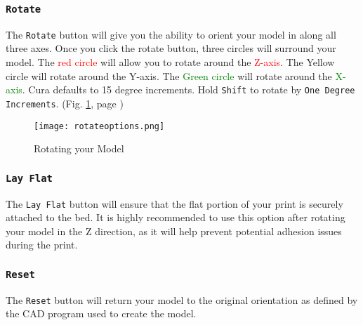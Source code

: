 \subsubsection{\texttt{Rotate}}
The \texttt{Rotate} button will give you the ability to orient your model in along all three axes. Once you click the rotate button, three circles will surround your model. The \textcolor{red}{red circle} will allow you to rotate around the \textcolor{red}{Z-axis}. The \textcolor{yellow1}{Yellow circle} will rotate around the \textcolor{yellow1}{Y-axis}. The \textcolor{green}{Green circle} will rotate around the \textcolor{green}{X-axis}. Cura defaults to 15 degree increments. Hold \texttt{Shift} to rotate by \texttt{One Degree Increments}. (Fig. \ref{fig:Rotating your Model}, page \pageref{fig:Rotating your Model})

\begin{figure}[H]
\centering
\texttt{[image: rotateoptions.png]}
\caption{Rotating your Model}
\label{fig:Rotating your Model}
\end{figure}

\subsubsection{\texttt{Lay Flat}}
The \texttt{Lay Flat} button will ensure that the flat portion of your print is securely attached to the bed. It is highly recommended to use this option after rotating your model in the Z direction, as it will help prevent potential adhesion issues during the print.

\subsubsection{\texttt{Reset}}
The \texttt{Reset} button will return your model to the original orientation as defined by the CAD program used to create the model.

